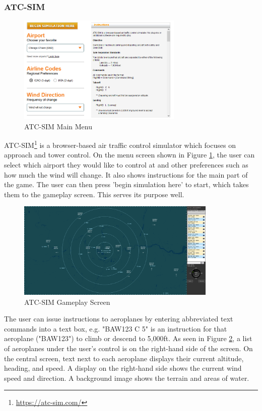 \documentclass{article}
\begin{document}
\subsubsection{ATC-SIM} \label{atc-sim}
\begin{figure}[H]
\centering
\includegraphics[width=0.7\textwidth]{existing_solutions/atcsimmenu.png}
\caption{\label{fig:atcsimmenu}ATC-SIM Main Menu}
\end{figure}
ATC-SIM\footnote{\url{https://atc-sim.com/}} is a browser-based air traffic control simulator which focuses on approach and tower control.
On the menu screen shown in Figure \ref{fig:atcsimmenu}, the user can select which airport they would like to control at and other preferences such as how much the wind will change.
It also shows instructions for the main part of the game.
The user can then press 'begin simulation here' to start, which takes them to the gameplay screen.
This serves its purpose well.
\begin{figure}[H]
\centering
\includegraphics[width=0.85\textwidth]{existing_solutions/atcsim1.png}
\caption{\label{fig:atcsim1}ATC-SIM Gameplay Screen}
\end{figure}
The user can issue instructions to aeroplanes by entering abbreviated text commands into a text box, e.g. "BAW123 C 5" is an instruction for that aeroplane ("BAW123") to climb or descend to 5,000ft.
As seen in Figure \ref{fig:atcsim1}, a list of aeroplanes under the user's control is on the right-hand side of the screen.
On the central screen, text next to each aeroplane displays their current altitude, heading, and speed.
A display on the right-hand side shows the current wind speed and direction.
A background image shows the terrain and areas of water.
\end{document}

